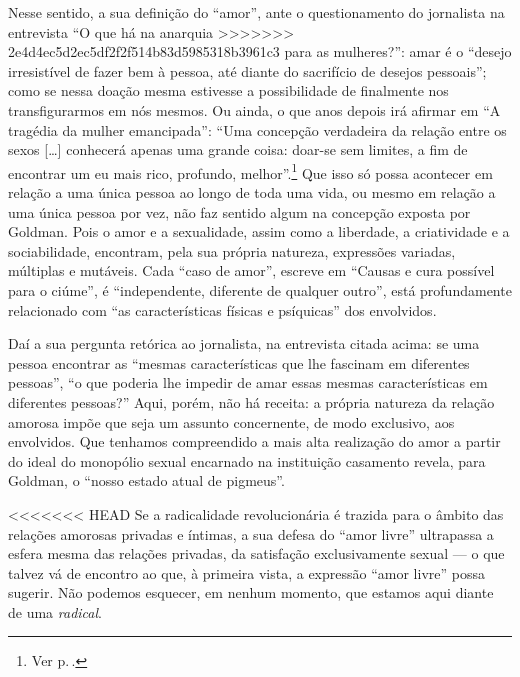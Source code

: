 {Nesse sentido, a sua definição do ``amor'',
ante o questionamento do jornalista na entrevista ``O que há na anarquia
>>>>>>> 2e4d4ec5d2ec5df2f2f514b83d5985318b3961c3
para as mulheres?'': amar é o ``desejo irresistível de fazer bem à
pessoa, até diante do sacrifício de desejos pessoais''; como se nessa
doação mesma estivesse a possibilidade de finalmente nos transfigurarmos
em nós mesmos. Ou ainda, o que anos depois irá afirmar em ``A tragédia
da mulher emancipada'': ``Uma concepção verdadeira da relação entre os
sexos {[}\ldots{]} conhecerá apenas uma grande coisa: doar-se sem limites,
a fim de encontrar um eu mais rico, profundo, melhor''.\footnote{Ver p.\,\pageref{concepcao}.} Que isso só
possa acontecer em relação a uma única pessoa ao longo de toda uma
vida, ou mesmo em relação a uma única pessoa por vez, não faz sentido algum na
concepção exposta por Goldman. Pois o amor e a
sexualidade, assim como a liberdade, a criatividade e a sociabilidade,
encontram, pela sua própria natureza, expressões variadas, múltiplas e
mutáveis. Cada ``caso de amor'', escreve em ``Causas e cura possível
para o ciúme'', é ``independente, diferente de qualquer outro'', está
profundamente relacionado com ``as características físicas e psíquicas''
dos envolvidos.

Daí a sua pergunta retórica ao jornalista, na entrevista
citada acima: se uma pessoa encontrar as ``mesmas características que lhe
fascinam em diferentes pessoas'', ``o que poderia lhe impedir de amar
essas mesmas características em diferentes pessoas?'' Aqui, porém, não
há receita: a própria natureza da relação amorosa impõe que seja um
assunto concernente, de modo exclusivo, aos envolvidos. Que tenhamos
compreendido a mais alta realização do amor a partir do ideal do
monopólio sexual encarnado na instituição casamento revela, para
Goldman, o ``nosso estado atual de pigmeus''.

<<<<<<< HEAD
Se a radicalidade revolucionária é trazida para
o âmbito das relações amorosas privadas e íntimas, a sua
defesa do ``amor livre'' ultrapassa a esfera mesma das relações
privadas, da satisfação exclusivamente sexual --- o que talvez
vá de encontro ao que, à primeira vista, a expressão ``amor livre''
possa sugerir. Não podemos esquecer, em nenhum momento, que estamos aqui
diante de uma \emph{radical}.

}
